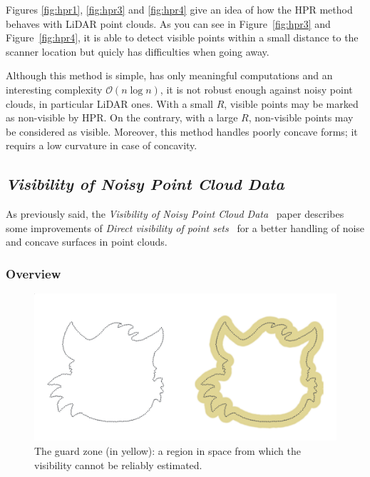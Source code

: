 Figures \ref{fig:hpr1}, \ref{fig:hpr3} and \ref{fig:hpr4} give an idea of how the HPR method behaves with LiDAR point clouds. As you can see in Figure~\ref{fig:hpr3} and Figure~\ref{fig:hpr4}, it is able to detect visible points within a small distance to the scanner location but quicly has difficulties when going away.

Although this method is simple, has only meaningful computations and an interesting complexity $\mathcal{O}(n\log{}n)$, it is not robust enough against noisy point clouds, in particular LiDAR ones. With a small $R$, visible points may be marked as non-visible by HPR. On the contrary, with a large $R$, non-visible points may be considered as visible. Moreover, this method handles poorly concave forms; it requirs a low curvature in case of concavity.


\subsection{\emph{Visibility of Noisy Point Cloud Data}}
\label{subsc:noisy}
As previously said, the \emph{Visibility of Noisy Point Cloud Data}~\cite{vis2} paper describes some improvements of \emph{Direct visibility of point sets}~\cite{vis1} for a better handling of noise and concave surfaces in point clouds.

\subsubsection{Overview}
\begin{figure}
  \centering
  \includegraphics[scale=0.2]{img/epsilon.png}
  \caption{The guard zone (in yellow): a region in space from which the visibility cannot be reliably estimated.}
  \label{fig:epsilon}
\end{figure}

